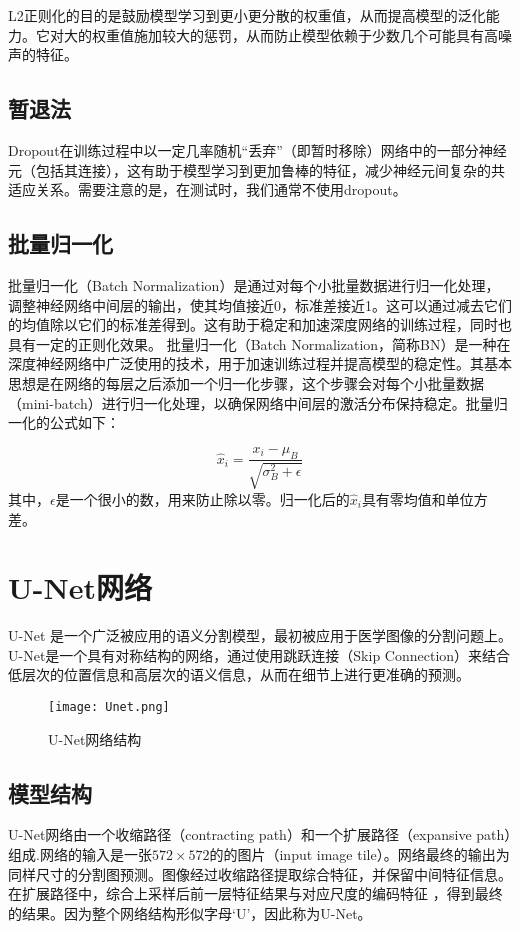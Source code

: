 L2正则化的目的是鼓励模型学习到更小更分散的权重值，从而提高模型的泛化能力。它对大的权重值施加较大的惩罚，从而防止模型依赖于少数几个可能具有高噪声的特征。

\subsection{暂退法}
Dropout在训练过程中以一定几率随机“丢弃”（即暂时移除）网络中的一部分神经元（包括其连接），这有助于模型学习到更加鲁棒的特征，减少神经元间复杂的共适应关系。需要注意的是，在测试时，我们通常不使用dropout。
\subsection{批量归一化}
批量归一化（Batch Normalization）是通过对每个小批量数据进行归一化处理，调整神经网络中间层的输出，使其均值接近0，标准差接近1。这可以通过减去它们的均值除以它们的标准差得到。这有助于稳定和加速深度网络的训练过程，同时也具有一定的正则化效果。
批量归一化（Batch Normalization，简称BN）是一种在深度神经网络中广泛使用的技术，用于加速训练过程并提高模型的稳定性。其基本思想是在网络的每层之后添加一个归一化步骤，这个步骤会对每个小批量数据（mini-batch）进行归一化处理，以确保网络中间层的激活分布保持稳定。批量归一化的公式如下：

\begin{equation}
  \hat{x}_i = \frac{x_i - \mu_B}{\sqrt{\sigma_B^2 + \epsilon}} 
\end{equation}
其中，$\epsilon$是一个很小的数，用来防止除以零。归一化后的\(\hat{x}_i\)具有零均值和单位方差。

\section{U-Net网络}
U-Net
\cite{ronnebergerUNetConvolutionalNetworks2015}是一个广泛被应用的语义分割模型，最初被应用于医学图像的分割问题上。U-Net是一个具有对称结构的网络，通过使用跳跃连接（Skip Connection）来结合低层次的位置信息和高层次的语义信息，从而在细节上进行更准确的预测。
\begin{figure}[h]
  \centering
  \texttt{[image: Unet.png]}
  \caption{U-Net网络结构}
  \label{fig:UNet}
\end{figure}
\subsection{模型结构}
U-Net网络由一个收缩路径（contracting path）和一个扩展路径（expansive path）组成.网络的输入是一张$572\times 572$的的图片（input image tile）。网络最终的输出为同样尺寸的分割图预测。图像经过收缩路径提取综合特征，并保留中间特征信息。在扩展路径中，综合上采样后前一层特征结果与对应尺度的编码特征 ，得到最终的结果。因为整个网络结构形似字母‘U’，因此称为U-Net。
